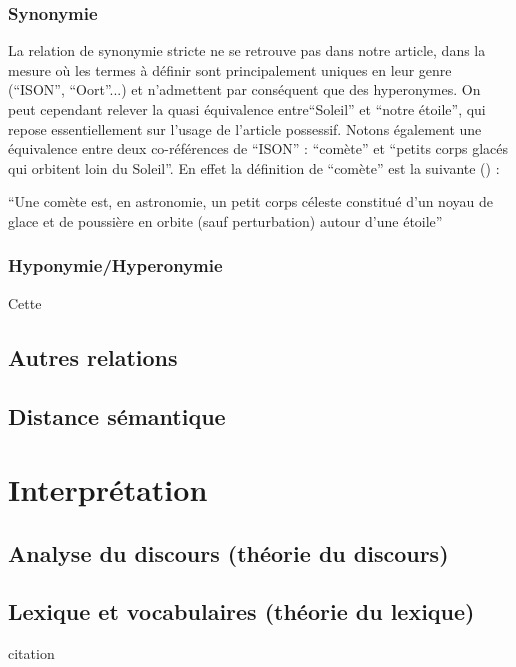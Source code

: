 \documentclass[a4paper,10pt]{article}
\begin{document}
		\subsubsection{Synonymie}
			La relation de synonymie stricte ne se retrouve pas dans notre article, dans la mesure où les termes à définir sont principalement uniques en leur genre (``ISON'', ``Oort''...) et n'admettent par conséquent que des hyperonymes. On peut cependant relever la quasi équivalence entre``Soleil'' et ``notre étoile'', qui repose essentiellement sur l'usage de l'article possessif. Notons également une équivalence entre deux co-références de ``ISON'' : ``comète'' et ``petits corps glacés qui orbitent loin du Soleil''. En effet la définition de ``comète'' est la suivante (\cite{comete}) :
			\begin{center}
				\footnotesize
				\begin{minipage}{0.7\textwidth}
					``Une comète est, en astronomie, un petit corps céleste constitué d'un noyau de glace et de poussière en orbite (sauf perturbation) autour d'une étoile''
				\end{minipage}
			\end{center}
		\subsubsection{Hyponymie/Hyperonymie}
			Cette
	\subsection{Autres relations}
	\subsection{Distance sémantique}

\section{Interprétation}
	\subsection{Analyse du discours (théorie du discours)}
	\subsection{Lexique et vocabulaires (théorie du lexique)}






\begin{center}
	\footnotesize
	\begin{minipage}{0.7\textwidth}
		citation
	\end{minipage}
\end{center}
\medskip




\end{document}
